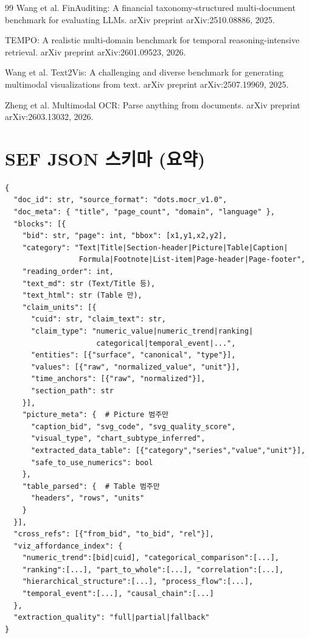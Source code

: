 \documentclass[11pt]{article}
\begin{document}
\begin{thebibliography}{99}
Wang et al. FinAuditing: A financial taxonomy-structured multi-document benchmark for evaluating LLMs. arXiv preprint arXiv:2510.08886, 2025.

TEMPO: A realistic multi-domain benchmark for temporal reasoning-intensive retrieval. arXiv preprint arXiv:2601.09523, 2026.

Wang et al. Text2Vis: A challenging and diverse benchmark for generating multimodal visualizations from text. arXiv preprint arXiv:2507.19969, 2025.

Zheng et al. Multimodal OCR: Parse anything from documents. arXiv preprint arXiv:2603.13032, 2026.

\end{thebibliography}

\appendix
\section{SEF JSON 스키마 (요약)}

\begin{tcolorbox}[colback=gray!5,colframe=gray!50,title=SEF (Strategic Evidence Format) 스키마]
\small
\begin{verbatim}
{
  "doc_id": str, "source_format": "dots.mocr_v1.0",
  "doc_meta": { "title", "page_count", "domain", "language" },
  "blocks": [{
    "bid": str, "page": int, "bbox": [x1,y1,x2,y2],
    "category": "Text|Title|Section-header|Picture|Table|Caption|
                 Formula|Footnote|List-item|Page-header|Page-footer",
    "reading_order": int,
    "text_md": str (Text/Title 등),
    "text_html": str (Table 만),
    "claim_units": [{
      "cuid": str, "claim_text": str,
      "claim_type": "numeric_value|numeric_trend|ranking|
                     categorical|temporal_event|...",
      "entities": [{"surface", "canonical", "type"}],
      "values": [{"raw", "normalized_value", "unit"}],
      "time_anchors": [{"raw", "normalized"}],
      "section_path": str
    }],
    "picture_meta": {  # Picture 범주만
      "caption_bid", "svg_code", "svg_quality_score",
      "visual_type", "chart_subtype_inferred",
      "extracted_data_table": [{"category","series","value","unit"}],
      "safe_to_use_numerics": bool
    },
    "table_parsed": {  # Table 범주만
      "headers", "rows", "units"
    }
  }],
  "cross_refs": [{"from_bid", "to_bid", "rel"}],
  "viz_affordance_index": {
    "numeric_trend":[bid|cuid], "categorical_comparison":[...],
    "ranking":[...], "part_to_whole":[...], "correlation":[...],
    "hierarchical_structure":[...], "process_flow":[...],
    "temporal_event":[...], "causal_chain":[...]
  },
  "extraction_quality": "full|partial|fallback"
}
\end{verbatim}
\end{tcolorbox}
\end{document}
